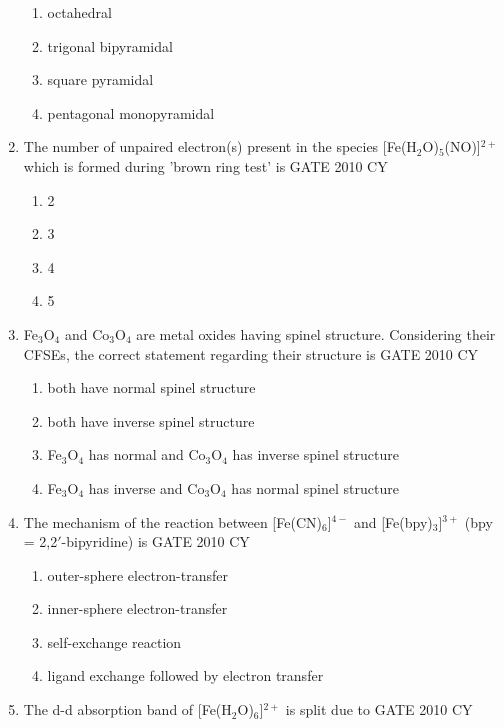 \documentclass[journal,12pt,onecolumn]{IEEEtran}
\theoremstyle{remark}
\begin{document}
\begin{enumerate}
\begin{multicols}{2}
\begin{enumerate}
    \item octahedral
    \item trigonal bipyramidal
    \item square pyramidal
    \item pentagonal monopyramidal
\end{enumerate}
\end{multicols}

\item The number of unpaired electron(s) present in the species [Fe(H$_2$O)$_5$(NO)]$^{2+}$ which is formed during 'brown ring test' is
\hfill{GATE 2010 CY}

\begin{multicols}{2}
\begin{enumerate}
    \item 2
    \item 3
    \item 4
    \item 5
\end{enumerate}
\end{multicols}

\item Fe$_3$O$_4$ and Co$_3$O$_4$ are metal oxides having spinel structure. Considering their CFSEs, the correct statement regarding their structure is
\hfill{GATE 2010 CY}

\begin{multicols}{2}
\begin{enumerate}
    \item both have normal spinel structure
    \item both have inverse spinel structure
    \item Fe$_3$O$_4$ has normal and Co$_3$O$_4$ has inverse spinel structure
    \item Fe$_3$O$_4$ has inverse and Co$_3$O$_4$ has normal spinel structure
\end{enumerate}
\end{multicols}

\item The mechanism of the reaction between [Fe(CN)$_6$]$^{4-}$ and [Fe(bpy)$_3$]$^{3+}$ (bpy = 2,2$'$-bipyridine) is
\hfill{GATE 2010 CY}

\begin{multicols}{2}
\begin{enumerate}
    \item outer-sphere electron-transfer
    \item inner-sphere electron-transfer
    \item self-exchange reaction
    \item ligand exchange followed by electron transfer
\end{enumerate}
\end{multicols}
\item The d-d absorption band of [Fe(H$_2$O)$_6$]$^{2+}$ is split due to
\hfill{GATE 2010 CY}


\end{enumerate}
\end{document}
